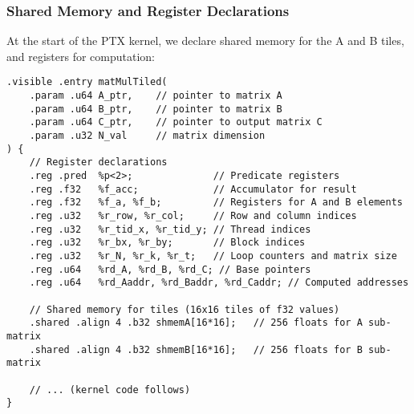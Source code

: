 \subsubsection{Shared Memory and Register Declarations}

At the start of the PTX kernel, we declare shared memory for the A and B tiles, and registers for computation:

\begin{lstlisting}[style=ptx]
.visible .entry matMulTiled(
    .param .u64 A_ptr,    // pointer to matrix A
    .param .u64 B_ptr,    // pointer to matrix B
    .param .u64 C_ptr,    // pointer to output matrix C
    .param .u32 N_val     // matrix dimension
) {
    // Register declarations
    .reg .pred  %p<2>;              // Predicate registers
    .reg .f32   %f_acc;             // Accumulator for result
    .reg .f32   %f_a, %f_b;         // Registers for A and B elements
    .reg .u32   %r_row, %r_col;     // Row and column indices
    .reg .u32   %r_tid_x, %r_tid_y; // Thread indices
    .reg .u32   %r_bx, %r_by;       // Block indices
    .reg .u32   %r_N, %r_k, %r_t;   // Loop counters and matrix size
    .reg .u64   %rd_A, %rd_B, %rd_C; // Base pointers
    .reg .u64   %rd_Aaddr, %rd_Baddr, %rd_Caddr; // Computed addresses
    
    // Shared memory for tiles (16x16 tiles of f32 values)
    .shared .align 4 .b32 shmemA[16*16];   // 256 floats for A sub-matrix
    .shared .align 4 .b32 shmemB[16*16];   // 256 floats for B sub-matrix
    
    // ... (kernel code follows)
}
\end{lstlisting}

